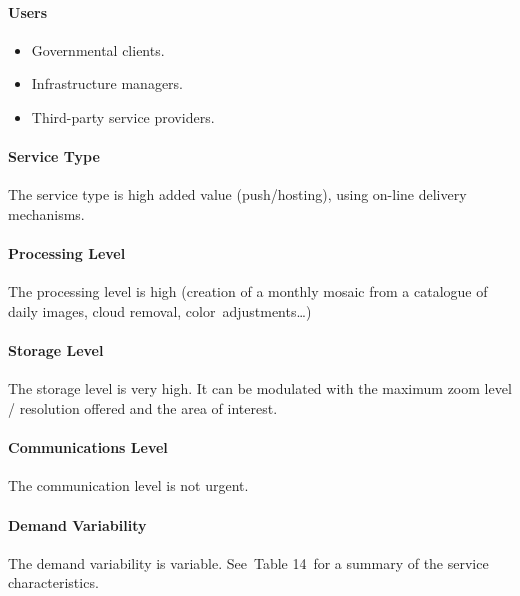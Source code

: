 \documentclass[a4paper]{article}
\newcommand\liststyleLFOxvi{%
\renewcommand\labelitemi{[F0B7?]}
\renewcommand\labelitemii{o}
\renewcommand\labelitemiii{[F0A7?]}
\renewcommand\labelitemiv{[F0B7?]}
}
\begin{document}
\paragraph[Users]{ Users}
\liststyleLFOxvi
\begin{itemize}
\item {
Governmental clients.}
\item {
Infrastructure managers.}
\item {
Third-party service providers.}
\end{itemize}
\paragraph[Service Type]{ Service Type}
{
The service type is high added value (push/hosting), using on-line
delivery mechanisms.}

\paragraph[Processing Level]{ Processing Level}
{
The processing level is high (creation of a monthly mosaic from a
catalogue of daily images, cloud removal, color\ adjustments{\dots})}

\paragraph[Storage Level]{ Storage Level}
{
The storage level is very high. It can be modulated with the maximum
zoom level / resolution offered and the area of interest.}

\paragraph[Communications Level]{ Communications
Level}
{
The communication level is not urgent.}

\paragraph[Demand Variability]{ Demand
Variability}
\foreignlanguage{english}{The demand variability is variable.
See\ }Table 14\foreignlanguage{english}{\ for a summary of the service
characteristics.}
\end{document}
